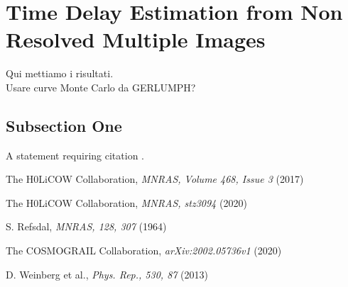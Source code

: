 \documentclass[twoside,twocolumn]{article}
\begin{document}
\section{Time Delay Estimation from Non Resolved Multiple Images}

Qui mettiamo i risultati.
\\
Usare curve Monte Carlo da GERLUMPH?



\subsection{Subsection One}

A statement requiring citation \cite{Figueredo:2009dg}.



\begin{thebibliography}{99} %

The H0LiCOW Collaboration,
\textit{MNRAS, Volume 468, Issue 3} (2017)

The H0LiCOW Collaboration,
\textit{MNRAS, stz3094} (2020)

S. Refsdal,
\textit{MNRAS, 128, 307} (1964)

The COSMOGRAIL Collaboration,
\textit{arXiv:2002.05736v1} (2020)

D. Weinberg et al.,
\textit{Phys. Rep., 530, 87} (2013)

\end{thebibliography}

\end{document}
